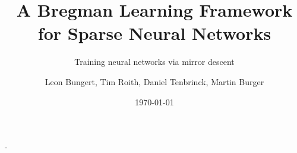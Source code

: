 \documentclass[final, 12pt]{beamer}
\title[]{A Bregman Learning Framework for
Sparse Neural Networks}
\subtitle{Training neural networks via mirror descent}
\author[T. Roith]{Leon Bungert, Tim Roith, Daniel Tenbrinck, Martin Burger}
\institute[FAU]{Friedrich-Alexander Universität Erlangen-Nürnberg, Department Mathematik}
\date{\today}
\begin{document}
\begin{frame}{-}{}
%
%
%
%
%
%
%
\end{frame}
\end{document}
